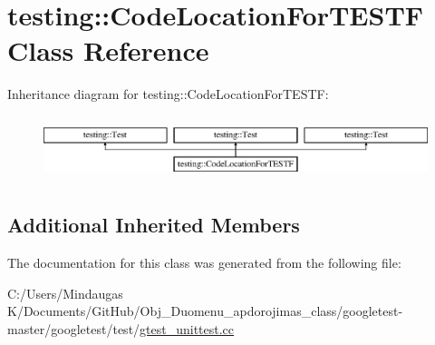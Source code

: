 \hypertarget{classtesting_1_1_code_location_for_t_e_s_t_f}{}\section{testing\+::Code\+Location\+For\+T\+E\+S\+TF Class Reference}
\label{classtesting_1_1_code_location_for_t_e_s_t_f}
Inheritance diagram for testing\+::Code\+Location\+For\+T\+E\+S\+TF\+:\begin{figure}[H]
\begin{center}
\leavevmode
\includegraphics[height=1.885522cm]{df/dc8/classtesting_1_1_code_location_for_t_e_s_t_f}
\end{center}
\end{figure}
\subsection*{Additional Inherited Members}


The documentation for this class was generated from the following file\+:\begin{DoxyCompactItemize}
\item 
C\+:/\+Users/\+Mindaugas K/\+Documents/\+Git\+Hub/\+Obj\+\_\+\+Duomenu\+\_\+apdorojimas\+\_\+class/googletest-\/master/googletest/test/\mbox{\hyperlink{googletest-master_2googletest_2test_2gtest__unittest_8cc}{gtest\+\_\+unittest.\+cc}}\end{DoxyCompactItemize}
